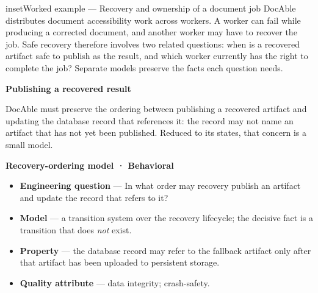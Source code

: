 \begin{bookbox}{inset}{Worked example --- Recovery and ownership of a document job}
\label{inset-docable-behavior}
DocAble distributes document accessibility work across workers. A worker can fail while producing a corrected document, and another worker may have to recover the job. Safe recovery therefore involves two related questions: when is a recovered artifact safe to publish as the result, and which worker currently has the right to complete the job? Separate models preserve the facts each question needs.

\textbf{Publishing a recovered result}

DocAble must preserve the ordering between publishing a recovered artifact and updating the database record that references it: the record may not name an artifact that has not yet been published. Reduced to its states, that concern is a small model.

\textbf{Recovery-ordering model · Behavioral}

\begin{itemize}
\tightlist
\item
  \textbf{Engineering question} --- In what order may recovery publish an artifact and update the record that refers to it?
\end{itemize}



\begin{itemize}
\tightlist
\item
  \textbf{Model} --- a transition system over the recovery lifecycle; the decisive fact is a transition that does \emph{not} exist.
\end{itemize}



\begin{itemize}
\tightlist
\item
  \textbf{Property} --- the database record may refer to the fallback artifact only after that artifact has been uploaded to persistent storage.
\end{itemize}



\begin{itemize}
\tightlist
\item
  \textbf{Quality attribute} --- data integrity; crash-safety.
\end{itemize}



\end{bookbox}
